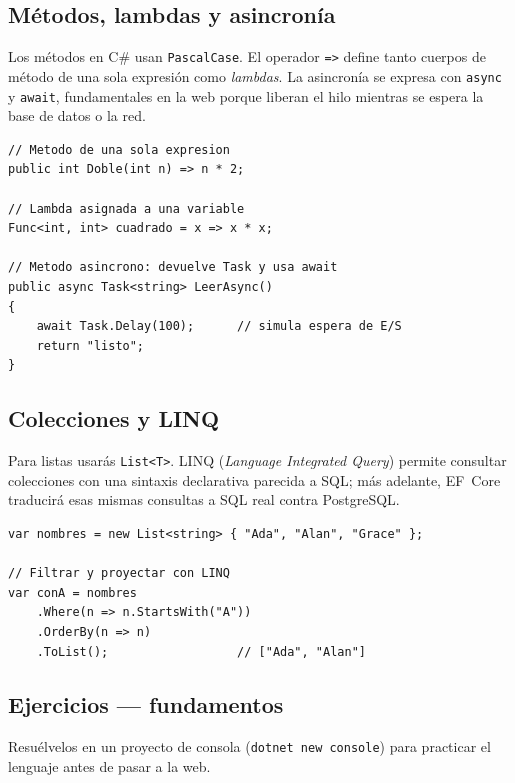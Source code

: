 \documentclass[11pt]{article}
\begin{document}
\subsection{Métodos, lambdas y asincronía}
Los métodos en C\# usan \texttt{PascalCase}. El operador \texttt{=>} define tanto cuerpos de método de una sola expresión como \emph{lambdas}. La asincronía se expresa con \texttt{async} y \texttt{await}, fundamentales en la web porque liberan el hilo mientras se espera la base de datos o la red.

\begin{cajacodigo}
\begin{lstlisting}[style=cs]
// Metodo de una sola expresion
public int Doble(int n) => n * 2;

// Lambda asignada a una variable
Func<int, int> cuadrado = x => x * x;

// Metodo asincrono: devuelve Task y usa await
public async Task<string> LeerAsync()
{
    await Task.Delay(100);      // simula espera de E/S
    return "listo";
}
\end{lstlisting}
\end{cajacodigo}

\subsection{Colecciones y LINQ}
Para listas usarás \texttt{List<T>}. LINQ (\emph{Language Integrated Query}) permite consultar colecciones con una sintaxis declarativa parecida a SQL; más adelante, EF~Core traducirá esas mismas consultas a SQL real contra PostgreSQL.

\begin{cajacodigo}
\begin{lstlisting}[style=cs]
var nombres = new List<string> { "Ada", "Alan", "Grace" };

// Filtrar y proyectar con LINQ
var conA = nombres
    .Where(n => n.StartsWith("A"))
    .OrderBy(n => n)
    .ToList();                  // ["Ada", "Alan"]
\end{lstlisting}
\end{cajacodigo}

\subsection{Ejercicios — fundamentos}
Resuélvelos en un proyecto de consola (\texttt{dotnet new console}) para practicar el lenguaje antes de pasar a la web.
\end{document}
